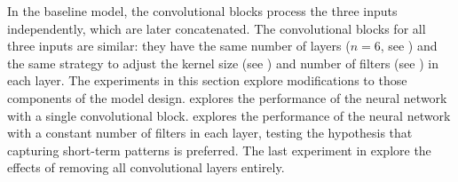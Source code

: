 
In the baseline model, the convolutional blocks process the
three inputs independently, which are later concatenated.
The convolutional blocks for all three inputs are similar:
they have the same number of layers ($n=6$, see
) and the same
strategy to adjust the kernel size (see
) and number of filters (see
) in each layer. The
experiments in this section explore modifications to those
components of the model design.
 explores the
performance of the neural network with a single
convolutional block. 
explores the performance of the neural network with a
constant number of filters in each layer, testing the
hypothesis that capturing short-term patterns is preferred.
The last experiment in 
explore the effects of removing all convolutional layers
entirely.
